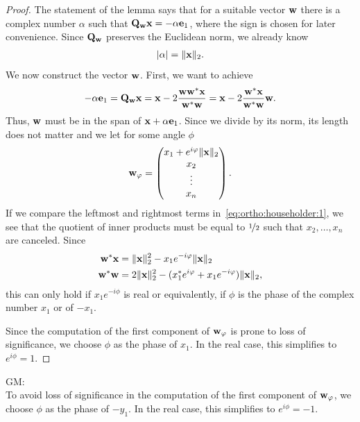 \begin{proof}
  The statement of the lemma says that for a suitable vector $\mathbf w$
  there is a complex number $\alpha$ such that
  $\mathbf Q_{\mathbf w} \mathbf x = -\alpha \mathbf e_1$, where the sign is chosen for
  later convenience. Since $\mathbf Q_{\mathbf w}$ preserves the Euclidean norm,
  we already know
  \begin{gather}
    \lvert\alpha\rvert = \lVert\mathbf x\rVert_2.
  \end{gather}
  We now construct the vector $\mathbf w$. First, we want to achieve
  \begin{gather}
    \label{eq:ortho:householder:1}
    -\alpha\mathbf e_1 = \mathbf Q_{\mathbf w} \mathbf x
    = \mathbf x - 2 \frac{\mathbf w\mathbf w^*\mathbf x}{\mathbf w^*\mathbf w}
    = \mathbf x - 2 \frac{\mathbf w^*\mathbf x}{\mathbf w^*\mathbf w}\mathbf w.
  \end{gather}
  Thus, $\mathbf w$ must be in the span of $\mathbf x+\alpha \mathbf e_1$. Since we divide by
  its norm, its length does not matter and we let for some angle $\phi$
  \begin{gather}
    \mathbf w_\varphi =
    \begin{pmatrix}
      x_1 + e^{i\varphi} \lVert\mathbf x\rVert_2\\x_2\\\vdots\\x_n
    \end{pmatrix}.
  \end{gather}
  If we compare the leftmost and rightmost terms
  in~\eqref{eq:ortho:householder:1}, we see that the quotient of inner
  products must be equal to $\nicefrac12$ such that $x_2,\dots,x_n$
  are canceled. Since
  \begin{align}
    \mathbf w^*\mathbf x &= \lVert\mathbf x\rVert_2^2 - x_1 e^{-i\varphi} \lVert\mathbf x\rVert_2
    \\
    \mathbf w^*\mathbf w &= 2\lVert\mathbf x\rVert_2^2 - (x_1^*e^{i\varphi} + x_1 e^{-i\varphi})\lVert\mathbf x\rVert_2,
  \end{align}
  this can only hold if $x_1 e^{-i\phi}$ is real or equivalently, if
  $\phi$ is the phase of the complex number $x_1$ or of $-x_1$.

  Since the computation of the first component of $\mathbf w_\varphi$ is prone
  to loss of significance, we choose $\phi$ as the phase of $x_1$. In
  the real case, this simplifies to $e^{i\phi} = 1$.
\end{proof}

\begin{todo}
  GM: \\
  To avoid loss of significance in the computation of the first component of \(\mathbf w_\varphi\), we choose \(\phi\) as the phase of
  \(-y_1\). In the real case, this simplifies to \(e^{i \phi} = -1\).
\end{todo}

